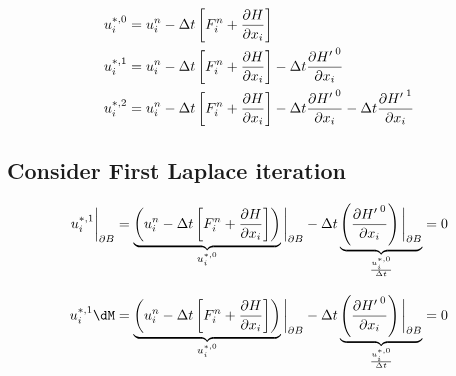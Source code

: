 \newpage


\begin{align}
u_i^{*,{0}} & = u_i^n - \Delta t \left[ F_i^n + \frac{\partial {H}}{\partial x_i} \right]     \nonumber \\
u_i^{*,{1}} & = u_i^n - \Delta t \left[ F_i^n + \frac{\partial {H}}{\partial x_i} \right] - \Delta t \frac{\partial {{H'\,}}^{0}}{\partial x_i}      \nonumber \\
u_i^{*,{2}} & = u_i^n - \Delta t \left[ F_i^n + \frac{\partial {H}}{\partial x_i} \right] - \Delta t  \frac{\partial {{H'\,}}^{0}}{\partial x_i} - \Delta t  \frac{\partial {{H'\,}}^{1}}{\partial x_i}     \nonumber \\
 \end{align}

\subsection{Consider First Laplace iteration}

\begin{align}  
%
\UIK{1}\dB  &=  \underbrace{\left(u_i^n - \Delta t \left[ F_i^n + \frac{\pH}{\pxi}\right] \right) }_{u_i^{*,0}}\dB -   \Delta t \underbrace{\left( \frac{\pHSK{0}}{\pxi}\right)\dB}_{\frac{u_i^{*,0}}{\Delta t}}   = 0 \nonumber \\[2ex]
%
\UIK{1}\dM  &=  \underbrace{\left(u_i^n - \Delta t \left[ F_i^n + \frac{\pH}{\pxi}\right] \right) }_{u_i^{*,0}}\dB -   \Delta t \underbrace{\left( \frac{\pHSK{0}}{\pxi}\right)\dB}_{\frac{u_i^{*,0}}{\Delta t}}   = 0 \nonumber \\[2ex]
 \end{align}






